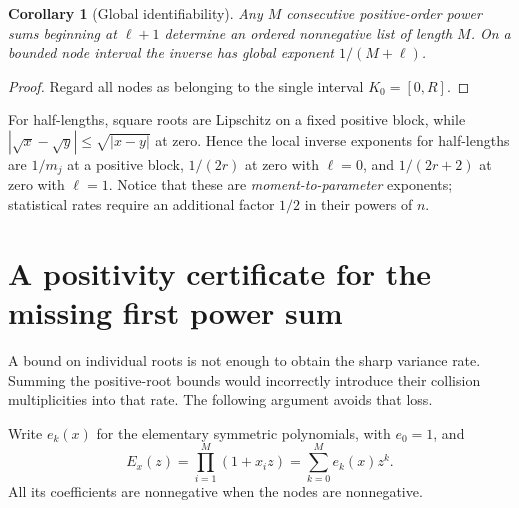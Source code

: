 \documentclass[11pt,a4paper]{article}
\numberwithin{equation}{section}
\newtheorem{corollary}[theorem]{Corollary}
\theoremstyle{definition}
\theoremstyle{remark}
\begin{document}
\begin{corollary}[Global identifiability]
\label{cor:identifiability}
Any $M$ consecutive positive-order power sums beginning at $\ell+1$ determine
an ordered nonnegative list of length $M$. On a bounded node interval the
inverse has global exponent $1/(M+\ell)$.
\end{corollary}
\begin{proof}
Regard all nodes as belonging to the single interval $K_0=[0,R]$.
\end{proof}

For half-lengths, square roots are Lipschitz on a fixed positive block, while
$|\sqrt x-\sqrt y|\le\sqrt{|x-y|}$ at zero. Hence the local inverse exponents
for half-lengths are $1/m_j$ at a positive block, $1/(2r)$ at zero with
$\ell=0$, and $1/(2r+2)$ at zero with $\ell=1$. Notice that these are
\emph{moment-to-parameter} exponents; statistical rates require an additional
factor $1/2$ in their powers of $n$.

\section{A positivity certificate for the missing first power sum}
\label{sec:p1}

A bound on individual roots is not enough to obtain the sharp variance rate.
Summing the positive-root bounds would incorrectly introduce their collision
multiplicities into that rate. The following argument avoids that loss.

Write $e_k(x)$ for the elementary symmetric polynomials, with $e_0=1$, and
\begin{equation}
 E_x(z)=\prod_{i=1}^M(1+x_i z)=\sum_{k=0}^M e_k(x)z^k.
\end{equation}
All its coefficients are nonnegative when the nodes are nonnegative.
\end{document}
